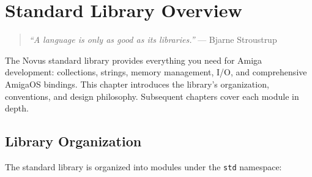 \chapter{Standard Library Overview}
\label{ch:stdlib-overview}

\begin{quote}
\textit{``A language is only as good as its libraries.''} --- Bjarne Stroustrup
\end{quote}

\vspace{1em}

The Novus standard library provides everything you need for Amiga development: collections, strings, memory management, I/O, and comprehensive AmigaOS bindings. This chapter introduces the library's organization, conventions, and design philosophy. Subsequent chapters cover each module in depth.

\section{Library Organization}
\label{sec:stdlib-organization}

The standard library is organized into modules under the \texttt{std} namespace:

\begin{center}
\end{center}

